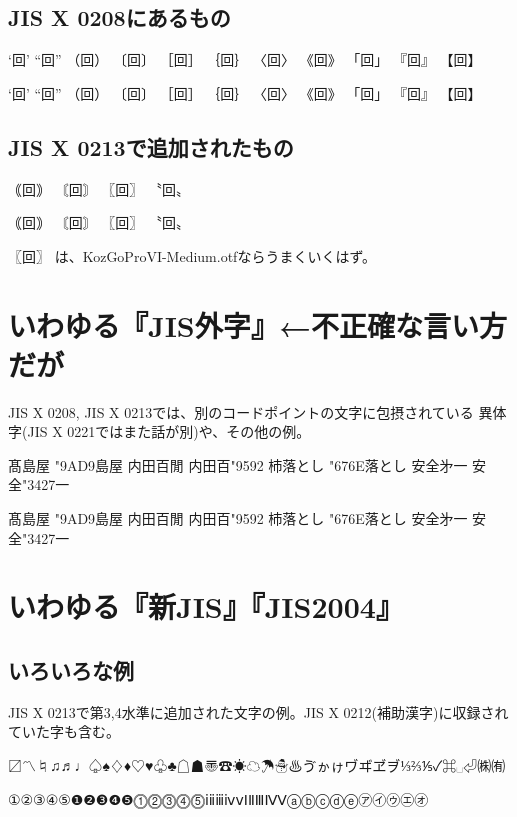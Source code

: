 \documentclass{utarticle}
\begin{document}
\subsection{JIS X 0208にあるもの}
‘回’ “回” （回） 〔回〕 ［回］ ｛回｝ 〈回〉 《回》 「回」 『回』 【回】

{\gt
‘回’ “回” （回） 〔回〕 ［回］ ｛回｝ 〈回〉 《回》 「回」 『回』 【回】
}


\subsection{JIS X 0213で追加されたもの}
｟回｠ 〘回〙 〖回〗 〝回〟

{\gt
｟回｠ 〘回〙 〖回〗 〝回〟
}

{\gt 〖回〗} は、KozGoProVI-Medium.otfならうまくいくはず。

\section{いわゆる『JIS外字』←不正確な言い方だが}
JIS X 0208, JIS X 0213では、別のコードポイントの文字に包摂されている
異体字(JIS X 0221ではまた話が別)や、その他の例。

髙島屋 \char"9AD9島屋\quad%
内田百閒 内田百\char"9592\quad%
杮落とし \char"676E落とし\quad%
安全﻿㐧一 安全\char"3427一\quad%

{\gt
髙島屋 \char"9AD9島屋\quad%
内田百閒 内田百\char"9592\quad%
杮落とし \char"676E落とし\quad%
安全﻿㐧一 安全\char"3427一\quad%
}

\section{いわゆる『新JIS』『JIS2004』}
\subsection{いろいろな例}
JIS X 0213で第3,4水準に追加された文字の例。JIS X 0212(補助漢字)に収録されていた字も含む。

〼〽♮♫♬♩♤♠♢♦♡♥♧♣☖☗〠☎☀☁☂☃♨ゔゕゖヷヸヹヺ⅓⅔⅕✓⌘␣⏎㈱㈲

①②③④⑤❶❷❸❹❺⓵⓶⓷⓸⓹ⅰⅱⅲⅳⅴⅠⅡⅢⅣⅤⓐⓑⓒⓓⓔ㋐㋑㋒㋓㋔
\end{document}
